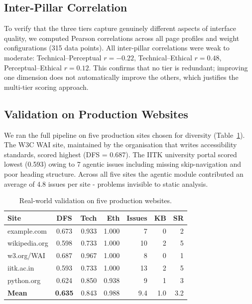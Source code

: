 \documentclass[runningheads]{llncs}
\begin{document}
\subsection{Inter-Pillar Correlation}

To verify that the three tiers capture genuinely different aspects of interface quality, we computed Pearson correlations across all page profiles and weight configurations (315 data points). All inter-pillar correlations were weak to moderate: Technical--Perceptual $r = -0.22$, Technical--Ethical $r = 0.48$, Perceptual--Ethical $r = 0.12$. This confirms that no tier is redundant; improving one dimension does not automatically improve the others, which justifies the multi-tier scoring approach.


\subsection{Validation on Production Websites}

We ran the full pipeline on five production sites chosen for diversity (Table~\ref{tab:realworld}). The W3C WAI site, maintained by the organisation that writes accessibility standards, scored highest (DFS = 0.687). The IITK university portal scored lowest (0.593) owing to 7 agentic issues including missing skip-navigation and poor heading structure. Across all five sites the agentic module contributed an average of 4.8 issues per site - problems invisible to static analysis.

\begin{table}[H]
\centering
\renewcommand{\arraystretch}{1.25}
\setlength{\tabcolsep}{8pt} %
\caption{Real-world validation on five production websites.}
\label{tab:realworld}
\begin{tabular}{l c r r r r r}
\toprule
\textbf{Site} & \textbf{DFS} & \textbf{Tech} & \textbf{Eth} & \textbf{Issues} & \textbf{KB} & \textbf{SR} \\
\midrule
example.com    & 0.673 & 0.933 & 1.000 &  7 & 0 & 2 \\
wikipedia.org  & 0.598 & 0.733 & 1.000 & 10 & 2 & 5 \\
w3.org/WAI     & 0.687 & 0.967 & 1.000 &  8 & 0 & 1 \\
iitk.ac.in     & 0.593 & 0.733 & 1.000 & 13 & 2 & 5 \\
python.org     & 0.624 & 0.850 & 0.938 &  9 & 1 & 3 \\
\midrule
\textbf{Mean}  & \textbf{0.635} & 0.843 & 0.988 & 9.4 & 1.0 & 3.2 \\
\bottomrule
\end{tabular}
\end{table}
\end{document}
